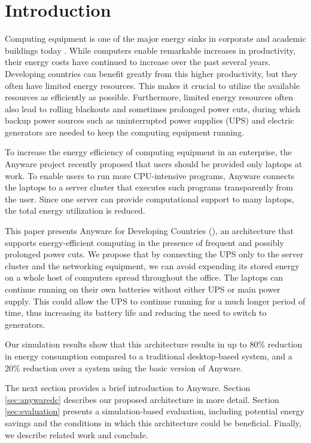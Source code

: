 \section{Introduction}

Computing equipment is one of the major energy sinks in corporate and academic 
buildings today \cite{kazandjieva2012green}. While computers enable remarkable 
increases in productivity, their energy costs have continued to increase over 
the past several years. Developing countries can benefit greatly from this
higher productivity, but they often have limited energy resources. 
This makes it crucial to utilize the available resources as efficiently as 
possible. Furthermore, limited energy resources often also lead to rolling 
blackouts and sometimes prolonged power cuts, during which backup power sources 
such as uninterrupted power supplies (UPS) and electric generators are needed 
to keep the computing equipment running.

To increase the energy efficiency of computing equipment in an enterprise, 
the Anyware project \cite{kazandjieva2014system}
recently proposed that users should be provided only laptops at work. 
To enable users to run more 
CPU-intensive programs, Anyware connects the laptops to a server cluster that executes
such programs transparently from the user. 
Since one server can provide computational support to many laptops, the 
total energy utilization is reduced.  

This paper presents Anyware for Developing Countries (\anywaredc), an architecture that supports
energy-efficient computing in the presence of frequent and possibly prolonged power cuts. We propose that by connecting 
the UPS only to the server cluster and the networking equipment, we can avoid expending its stored energy 
on a whole host of computers spread throughout the office. The laptops can continue running on their own 
batteries without either UPS or main power supply. This could allow the UPS to 
continue running for a much longer period of time, thus increasing its battery 
life and reducing the need to switch to generators.


Our simulation results show that this architecture results in up to 80\% 
reduction in energy consumption compared to a traditional desktop-based system, and a 
20\% reduction over a system using the basic version of Anyware.

The next section provides a brief introduction to Anyware. Section 
\ref{sec:anywaredc} describes our proposed
architecture in more detail. Section \ref{sec:evaluation} presents a simulation-based 
evaluation, including potential energy savings and the 
conditions in which this architecture could be beneficial. Finally, we describe
related work and conclude.

